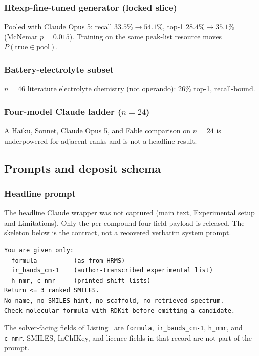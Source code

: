 \subsubsection{IRexp-fine-tuned generator (locked slice)}
Pooled with Claude Opus 5: recall $33.5\%\to54.1\%$, top-1 $28.4\%\to35.1\%$
(McNemar $p{=}0.015$).
Training on the same peak-list resource moves
$P(\mathrm{true}\in\mathrm{pool})$.

\subsubsection{Battery-electrolyte subset}
$n{=}46$ literature electrolyte chemistry (not operando): 26\% top-1,
recall-bound.

\subsubsection{Four-model Claude ladder \texorpdfstring{($n{=}24$)}{(n=24)}}
\label{si:ladder24}
A Haiku, Sonnet, Claude Opus 5, and Fable comparison on $n{=}24$ is underpowered
for adjacent ranks and is not a headline result.

\subsection{Prompts and deposit schema}
\label{si:prompt}

\subsubsection{Headline prompt}

The headline Claude wrapper was not captured
(main text, Experimental setup and Limitations).
Only the per-compound four-field payload is released.
The skeleton below is the contract, not a recovered verbatim system prompt.

\begin{lstlisting}[style=prompt]
You are given only:
  formula          (as from HRMS)
  ir_bands_cm-1    (author-transcribed experimental list)
  h_nmr, c_nmr     (printed shift lists)
Return <= 3 ranked SMILES.
No name, no SMILES hint, no scaffold, no retrieved spectrum.
Check molecular formula with RDKit before emitting a candidate.
\end{lstlisting}

The solver-facing fields of Listing~ are
\texttt{formula}, \texttt{ir\_bands\_cm-1}, \texttt{h\_nmr}, and
\texttt{c\_nmr}.
SMILES, InChIKey, and licence fields in that record are not part of the prompt.


